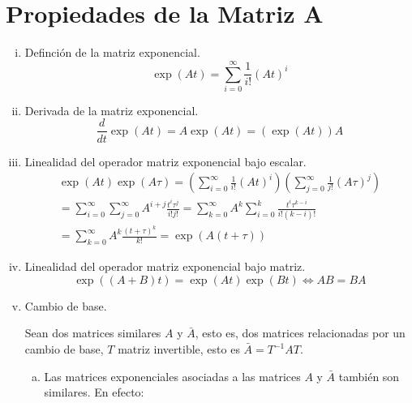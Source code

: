     \section{Propiedades de la Matriz A}
        \begin{enumerate}[i)]
            \item Definción de la matriz exponencial.
            \begin{equation}
                \exp{(A t)} = \sum\limits_{i=0}^{\infty} \frac{1}{i!} (A t)^i
            \end{equation}

            \item Derivada de la matriz exponencial.
            \begin{equation}
                \frac{d}{dt} \exp{(A t)} = A \exp{(A t)} = (\exp{(A t)}) A
            \end{equation}

            \item Linealidad del operador matriz exponencial bajo escalar.
            \begin{multline}
                \exp{(At)} \exp{(A \tau)} = \left( \sum\limits_{i=0}^{\infty} \frac{1}{i!} (A t)^i \right) \left( \sum\limits_{j=0}^{\infty} \frac{1}{j!} (A \tau)^j \right) \\
                = \sum\limits_{i=0}^{\infty} \sum\limits_{j=0}^{\infty} A^{i+j} \frac{t^i \tau^j}{i! j!} = \sum\limits_{k=0}^{\infty} A^k \sum\limits_{i=0}^{k} \frac{t^i \tau^{k-i}}{i! (k-i)!} \\
                = \sum\limits_{k=0}^{\infty} A^k \frac{(t + \tau)^k}{k!} = \exp{(A(t + \tau))}
            \end{multline}

            \item Linealidad del operador matriz exponencial bajo matriz.
            \begin{equation}
                \exp{((A + B) t)} = \exp{(A t)} \exp{(B t)} \iff A B = B A
            \end{equation}

            \item Cambio de base.

            Sean dos matrices similares $A$ y $\bar{A}$, esto es, dos matrices relacionadas por un cambio de base, $T$ matriz invertible, esto es $\bar{A} = T^{-1} A T$.

            \begin{enumerate}[a)]
                \item Las matrices exponenciales asociadas a las matrices $A$ y $\bar{A}$ también son similares. En efecto:


\end{enumerate}
\end{enumerate}
